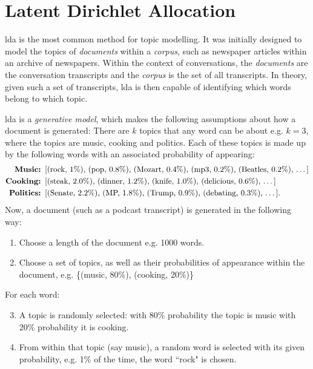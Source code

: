 \section{Latent Dirichlet Allocation \label{ssec: LDA}}
    \Gls{lda}\cite{blei2003latent} is the most common method for topic modelling. It was initially designed to model the topics of \textit{documents} within a \textit{corpus}, such as newspaper articles within an archive of newspapers. 
    Within the context of conversations, the \textit{documents} are the conversation transcripts and the \textit{corpus} is the set of all transcripts. In theory, given such a set of transcripts, \gls{lda} is then capable of identifying which words belong to which topic.
    

    \gls{lda} is a \textit{generative model}, which makes the following assumptions about how a document is generated: There are $k$ topics that any word can be about e.g. $k=3$, where the topics are music, cooking and politics. Each of these topics is made up by the following words with an associated probability of appearing:
    \begin{align*}
        \textbf{Music:  }& \text{[(rock, 1\%), (pop, 0.8\%), (Mozart, 0.4\%), (mp3, 0.2\%), (Beatles, 0.2\%), \dots]}\\
        \textbf{Cooking:    }& \text{[(steak, 2.0\%), (dinner, 1.2\%), (knife, 1.0\%), (delicious, 0.6\%), \dots]}\\
        \textbf{Politics:   }& \text{[(Senate, 2.2\%), (MP, 1.8\%), (Trump, 0.9\%), (debating, 0.3\%), \dots]}.
    \end{align*}
    Now, a document (such as a podcast transcript) is generated in the following way:

    \begin{enumerate}
        \item Choose a length of the document e.g. 1000 words.
        \item Choose a set of topics, as well as their probabilities of appearance within the document, e.g. \{(music, 80\%), (cooking, 20\%)\}
    \end{enumerate}

    For each word:
    \begin{enumerate}[leftmargin=6em]
    \setcounter{enumi}{2}
        \item A topic is randomly selected: with 80\% probability the topic is music with 20\% probability it is cooking.
        \item From within that topic (say music), a random word is selected with its given probability, e.g. 1\% of the time, the word ``rock" is chosen.
    \end{enumerate}

